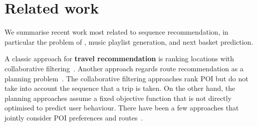 




\section{Related work}
\label{sec:related}


We summarise recent work most related to sequence recommendation, 
in particular the problem of \trajrec, music playlist generation, 
and next basket prediction.


A classic approach for {\bf travel recommendation} is ranking locations with 
collaborative filtering~\cite{zhang2015location,ijcai13}.
Another approach regards route recommendation as a planning problem~\cite{brilhante2013shall,gioniswsdm14,ijcai15}.
The collaborative filtering approaches rank POI but do not take into account the sequence that a trip is taken. 
On the other hand, the planning approaches assume a fixed objective function that is not directly optimised to predict user behaviour. 
There have been a few approaches that jointly consider POI preferences and 
routes~\cite{chen2015tripplanner,cikm16paper}.

